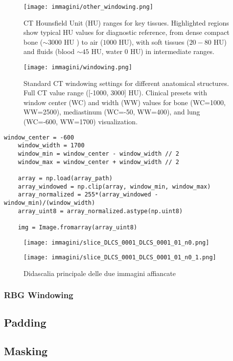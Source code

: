 \begin{figure}
    \centering
    \texttt{[image: immagini/other\_windowing.png]}
    \caption{CT Hounsfield Unit (HU) ranges for key tissues. Highlighted regions show typical HU values for diagnostic reference, from dense compact bone ($\sim 3000$ HU ) to air ($1000$ HU), with soft tissues ($20-80$ HU) and fluids (blood $\sim 45$ HU, water $0$ HU) in intermediate ranges.}
    \label{fig:general_windowing}
\end{figure}

\begin{figure}
    \centering
    \texttt{[image: immagini/windowing.png]}
    \caption{Standard CT windowing settings for different anatomical structures. Full CT value range ([-1000, 3000] HU). Clinical presets with window center (WC) and width (WW) values for bone (WC=1000, WW=2500), mediastinum (WC=-50, WW=400), and lung (WC=-600, WW=1700) visualization.}
    \label{fig:windowing_lung}
\end{figure}


\begin{lstlisting}[style=mystyle]
    window_center = -600    
    window_width = 1700   
    window_min = window_center - window_width // 2
    window_max = window_center + window_width // 2

    array = np.load(array_path)
    array_windowed = np.clip(array, window_min, window_max)  
    array_normalized = 255*(array_windowed - window_min)/(window_width)
    array_uint8 = array_normalized.astype(np.uint8) 

    img = Image.fromarray(array_uint8)
\end{lstlisting}


\begin{figure}[htbp]
    \centering
    \begin{minipage}[b]{0.6\textwidth}
        \centering
        \texttt{[image: immagini/slice\_DLCS\_0001\_DLCS\_0001\_01\_n0.png]}
        \label{fig:image_a}
    \end{minipage}
    \hfill
    \begin{minipage}[b]{0.6\textwidth}
        \centering
        \texttt{[image: immagini/slice\_DLCS\_0001\_DLCS\_0001\_01\_n0\_1.png]}
        \label{fig:image_b}
    \end{minipage}
    
    \caption{Didascalia principale delle due immagini affiancate}
    \label{fig:combined}
\end{figure}

\subsubsection{RBG Windowing}
\subsection{Padding}
\subsection{Masking}
